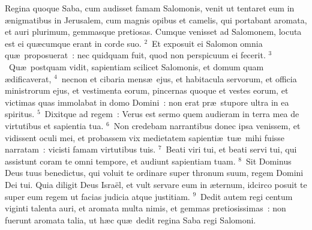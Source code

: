 \lettrine[lines=10,image=true,loversize=0.05,lraise=-0.03]{R}{}egina quoque Saba, cum audisset famam Salomonis, venit ut tentaret eum in \ae nigmatibus in Jerusalem, cum magnis opibus et camelis, qui portabant aromata, et auri plurimum, gemmasque pretiosas. Cumque venisset ad Salomonem, locuta est ei qu\ae cumque erant in corde suo.
${}^{2}$~Et exposuit ei Salomon omnia qu\ae\ proposuerat~: nec quidquam fuit, quod non perspicuum ei fecerit.
${}^{3}$~Qu\ae\ postquam vidit, sapientiam scilicet Salomonis, et domum quam \ae dificaverat,
${}^{4}$~necnon et cibaria mens\ae\ ejus, et habitacula servorum, et officia ministrorum ejus, et vestimenta eorum, pincernas quoque et vestes eorum, et victimas quas immolabat in domo Domini~: non erat pr\ae\ stupore ultra in ea spiritus.
${}^{5}$~Dixitque ad regem~: Verus est sermo quem audieram in terra mea de virtutibus et sapientia tua.
${}^{6}$~Non credebam narrantibus donec ipsa venissem, et vidissent oculi mei, et probassem vix medietatem sapienti\ae\ tu\ae\ mihi fuisse narratam~: vicisti famam virtutibus tuis.
${}^{7}$~Beati viri tui, et beati servi tui, qui assistunt coram te omni tempore, et audiunt sapientiam tuam.
${}^{8}$~Sit Dominus Deus tuus benedictus, qui voluit te ordinare super thronum suum, regem Domini Dei tui. Quia diligit Deus Isra\"el, et vult servare eum in \ae ternum, idcirco posuit te super eum regem ut facias judicia atque justitiam.
${}^{9}$~Dedit autem regi centum viginti talenta auri, et aromata multa nimis, et gemmas pretiosissimas~: non fuerunt aromata talia, ut h\ae c qu\ae\ dedit regina Saba regi Salomoni.


